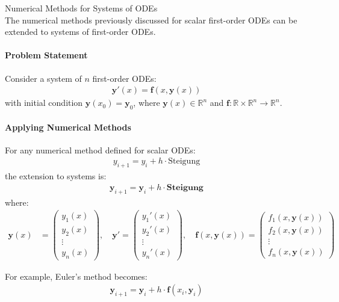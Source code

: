\begin{KR}{Numerical Methods for Systems of ODEs}\\
The numerical methods previously discussed for scalar first-order ODEs can be extended to systems of first-order ODEs.

\paragraph{Problem Statement}
Consider a system of $n$ first-order ODEs:
\begin{align*}
\mathbf{y}'(x) = \mathbf{f}(x, \mathbf{y}(x))
\end{align*}
with initial condition $\mathbf{y}(x_0) = \mathbf{y}_0$, where $\mathbf{y}(x) \in \mathbb{R}^n$ and $\mathbf{f}: \mathbb{R} \times \mathbb{R}^n \rightarrow \mathbb{R}^n$.

\paragraph{Applying Numerical Methods}
For any numerical method defined for scalar ODEs:
\begin{align*}
y_{i+1} = y_i + h \cdot \text{Steigung}
\end{align*}
the extension to systems is:
\begin{align*}
\mathbf{y}_{i+1} = \mathbf{y}_i + h \cdot \mathbf{Steigung}
\end{align*}
where:
\begin{align*}
\mathbf{y}(x) &= \begin{pmatrix} y_1(x) \\ y_2(x) \\ \vdots \\ y_n(x) \end{pmatrix}, \quad
\mathbf{y}' = \begin{pmatrix} y_1'(x) \\ y_2'(x) \\ \vdots \\ y_n'(x) \end{pmatrix}, \quad
\mathbf{f}(x, \mathbf{y}(x)) = \begin{pmatrix} f_1(x, \mathbf{y}(x)) \\ f_2(x, \mathbf{y}(x)) \\ \vdots \\ f_n(x, \mathbf{y}(x)) \end{pmatrix}
\end{align*}

For example, Euler's method becomes:
\begin{align*}
\mathbf{y}_{i+1} = \mathbf{y}_i + h \cdot \mathbf{f}(x_i, \mathbf{y}_i)
\end{align*}


\end{KR}
